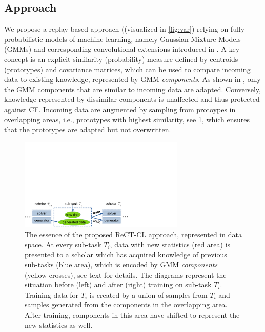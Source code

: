 \documentclass{article} %
\begin{document}
\subsection{Approach}
%
We propose a replay-based approach ((visualized in \cref{fig:var}) relying on fully probabilistic models of machine learning, namely Gaussian Mixture Models (GMMs) and corresponding convolutional extensions introduced in \cite{gmmsgd,dcgmm-ijcnn}.
A key concept is an explicit similarity (probability) measure defined by centroids (prototypes) and covariance matrices, which can be used to compare incoming data to existing knowledge, represented by GMM \textit{components}. 
As shown in \cite{sgdgmm}, only the GMM components that are similar to incoming data are adapted. Conversely, knowledge represented by dissimilar components is unaffected and thus protected against CF. 
Incoming data are augmented by sampling from protoypes in overlapping areas, i.e., prototypes with highest similarity, see \cref{fig:approach}, which ensures that the prototypes are adapted but not overwritten. 
\begin{figure}
    \centering
    \includegraphics*[width=0.7\textwidth,page=3,viewport=0in 0in 12cm 3cm]{figs.pdf}
    \caption{The essence of the proposed ReCT-CL approach, represented in data space. At every sub-task $T_i$, data with new statistics (red area) is presented to a scholar which has acquired knowledge of previous sub-tasks (blue area), which is encoded by GMM \textit{components} (yellow crosses), see text for details. The diagrams represent the situation before (left) and after (right) training on sub-task $T_i$. Training data for $T_i$ is created by a union of samples from $T_i$ and samples generated from the components in the overlapping area. After training, components in this area have shifted to represent the new statistics as well. }
    \label{fig:approach}

\end{figure}
%
\end{document}
